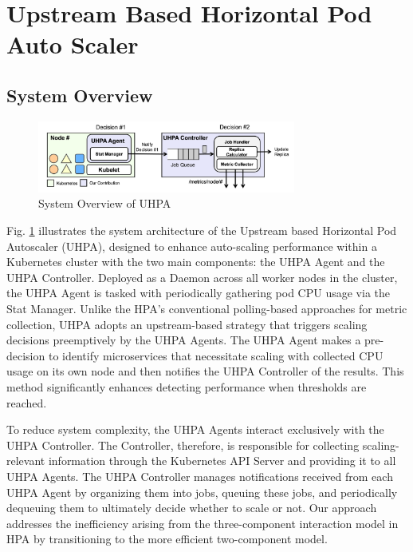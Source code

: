 \documentclass[conference]{IEEEtran}
\begin{document}
\section{Upstream Based Horizontal Pod Auto Scaler}
\subsection{System Overview}

\begin{figure}[ht!]
    \centerline{\includegraphics[width=8.5cm]{leejaehong/images/approch/uhpa_system_design.png}}
    \caption{System Overview of UHPA}
    \label{fig:uhpa system design}
\end{figure}
Fig. \ref{fig:uhpa system design} illustrates the system architecture of the Upstream based Horizontal Pod Autoscaler (UHPA), designed to enhance auto-scaling performance within a Kubernetes cluster with the two main components: the UHPA Agent and the UHPA Controller. Deployed as a Daemon across all worker nodes in the cluster, the UHPA Agent is tasked with periodically gathering pod CPU usage via the Stat Manager. Unlike the HPA’s conventional polling-based approaches for metric collection, UHPA adopts an upstream-based strategy that triggers scaling decisions preemptively by the UHPA Agents. The UHPA Agent makes a pre-decision to identify microservices  that necessitate scaling with collected CPU usage on its own node and then notifies the UHPA Controller of the results. This method significantly enhances detecting performance when thresholds are reached.

To reduce system complexity, the UHPA Agents interact exclusively with the UHPA Controller. The Controller, therefore, is responsible for collecting scaling-relevant information through the Kubernetes API Server and providing it to all UHPA Agents. The UHPA Controller manages notifications received from each UHPA Agent by organizing them into jobs, queuing these jobs, and periodically dequeuing them to ultimately decide whether to scale or not. Our approach addresses the inefficiency arising from the three-component interaction model in HPA by transitioning to the more efficient two-component model.
\end{document}
